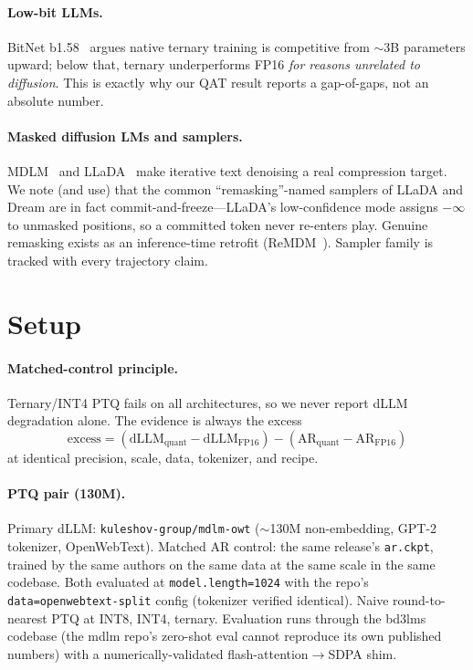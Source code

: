 \documentclass[11pt]{article}
\begin{document}
\paragraph{Low-bit LLMs.} BitNet b1.58~\cite{bitnet} argues native ternary training is competitive from $\sim$3B parameters upward; below that, ternary underperforms FP16 \emph{for reasons unrelated to diffusion}. This is exactly why our QAT result reports a gap-of-gaps, not an absolute number.

\paragraph{Masked diffusion LMs and samplers.} MDLM~\cite{mdlm} and LLaDA~\cite{llada} make iterative text denoising a real compression target. We note (and use) that the common ``remasking''-named samplers of LLaDA and Dream are in fact commit-and-freeze---LLaDA's low-confidence mode assigns $-\infty$ to unmasked positions, so a committed token never re-enters play. Genuine remasking exists as an inference-time retrofit (ReMDM~\cite{remdm}). Sampler family is tracked with every trajectory claim.

\section{Setup}

\paragraph{Matched-control principle.} Ternary/INT4 PTQ fails on all architectures, so we never report dLLM degradation alone. The evidence is always the excess
\[
\text{excess} = (\text{dLLM}_{\text{quant}} - \text{dLLM}_{\text{FP16}}) - (\text{AR}_{\text{quant}} - \text{AR}_{\text{FP16}})
\]
at identical precision, scale, data, tokenizer, and recipe.

\paragraph{PTQ pair (130M).} Primary dLLM: \texttt{kuleshov-group/mdlm-owt} ($\sim$130M non-embedding, GPT-2 tokenizer, OpenWebText). Matched AR control: the same release's \texttt{ar.ckpt}, trained by the same authors on the same data at the same scale in the same codebase. Both evaluated at \texttt{model.length=1024} with the repo's \texttt{data=openwebtext-split} config (tokenizer verified identical). Naive round-to-nearest PTQ at INT8, INT4, ternary. Evaluation runs through the bd3lms codebase (the mdlm repo's zero-shot eval cannot reproduce its own published numbers) with a numerically-validated flash-attention$\to$SDPA shim.
\end{document}
